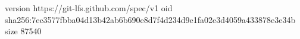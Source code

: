 version https://git-lfs.github.com/spec/v1
oid sha256:7ec3577fbba04d13b42ab6b690e8d7f4d234d9e1fa02e3d4059a433878e3e34b
size 87540

